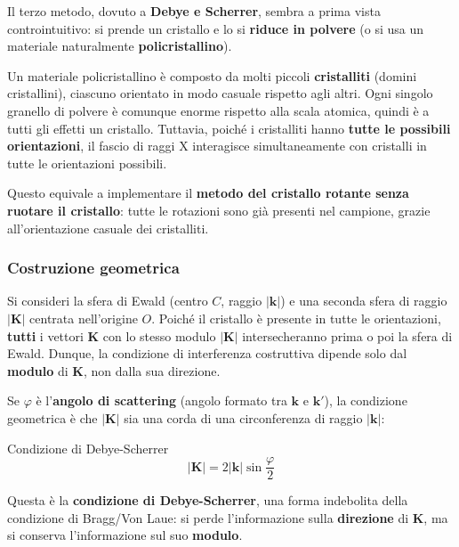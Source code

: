 Il terzo metodo, dovuto a \textbf{Debye e Scherrer}, sembra a prima vista controintuitivo: si prende un cristallo e lo si \textbf{riduce in polvere} (o si usa un materiale naturalmente \textbf{policristallino}).

Un materiale policristallino è composto da molti piccoli \textbf{cristalliti} (domini cristallini), ciascuno orientato in modo casuale rispetto agli altri. Ogni singolo granello di polvere è comunque enorme rispetto alla scala atomica, quindi è a tutti gli effetti un cristallo. Tuttavia, poiché i cristalliti hanno \textbf{tutte le possibili orientazioni}, il fascio di raggi X interagisce simultaneamente con cristalli in tutte le orientazioni possibili.

Questo equivale a implementare il \textbf{metodo del cristallo rotante senza ruotare il cristallo}: tutte le rotazioni sono già presenti nel campione, grazie all'orientazione casuale dei cristalliti.

\subsubsection*{Costruzione geometrica}

Si consideri la sfera di Ewald (centro $C$, raggio $|\mathbf{k}|$) e una seconda sfera di raggio $|\mathbf{K}|$ centrata nell'origine $O$. Poiché il cristallo è presente in tutte le orientazioni, \textbf{tutti} i vettori $\mathbf{K}$ con lo stesso modulo $|\mathbf{K}|$ intersecheranno prima o poi la sfera di Ewald. Dunque, la condizione di interferenza costruttiva dipende solo dal \textbf{modulo} di $\mathbf{K}$, non dalla sua direzione.

Se $\varphi$ è l'\textbf{angolo di scattering} (angolo formato tra $\mathbf{k}$ e $\mathbf{k}'$), la condizione geometrica è che $|\mathbf{K}|$ sia una corda di una circonferenza di raggio $|\mathbf{k}|$:

\begin{equazione}{Condizione di Debye-Scherrer}
\begin{equation}
|\mathbf{K}| = 2|\mathbf{k}|\sin\frac{\varphi}{2}
\end{equation}
\end{equazione}

Questa è la \textbf{condizione di Debye-Scherrer}, una forma indebolita della condizione di Bragg/Von Laue: si perde l'informazione sulla \textbf{direzione} di $\mathbf{K}$, ma si conserva l'informazione sul suo \textbf{modulo}.

